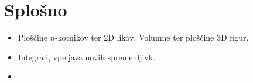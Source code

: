 \section{Splošno}
\todo{}
\begin{itemize}
    \item Ploščine \(n\)-kotnikov ter 2D likov. Volumne ter ploščine 3D figur.
    \item Integrali, vpeljava novih spremenljivk.
    \item 
\end{itemize}